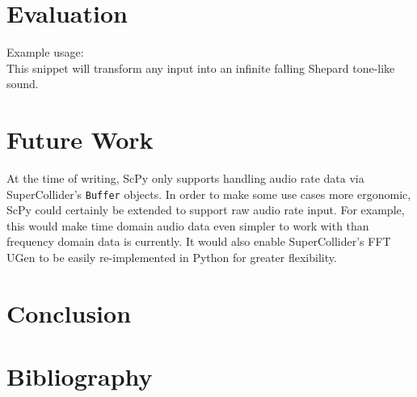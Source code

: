\documentclass{article}
\begin{document}
\section{Evaluation}

Example usage:\\
This snippet will transform any input into an infinite falling Shepard tone-like
sound.


\section{Future Work}

At the time of writing, ScPy only supports handling audio rate data via SuperCollider's
\texttt{Buffer} objects. In order to make some use cases more ergonomic, ScPy could certainly be
extended to support raw audio rate input. For example, this would make time domain audio data even
simpler to work with than frequency domain data is currently. It would also enable
SuperCollider's FFT UGen to be easily re-implemented in Python for greater flexibility.

\section{Conclusion}

\section{Bibliography}
\end{document}
